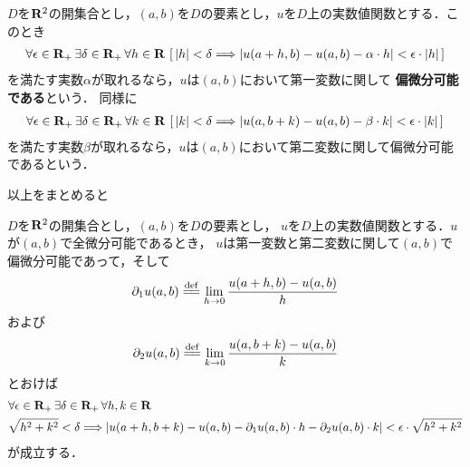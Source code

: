 	\begin{screen}
		\begin{dfn}[偏微分]\label{def:partially_differentiability}
			$D$を$\mathbf{R}^2$の開集合とし，$(a,b)$を$D$の要素とし，$u$を$D$上の実数値関数とする．このとき
			\begin{align}
				\forall \epsilon \in \mathbf{R}_+\, \exists \delta \in \mathbf{R}_+\, \forall h \in \mathbf{R}\, 
				\left[\, |h| < \delta \Longrightarrow
				\left|u(a+h,b) - u(a,b) - \alpha \cdot h\right| < \epsilon \cdot |h|\, \right]
			\end{align}
			を満たす実数$\alpha$が取れるなら，$u$は$(a,b)$において第一変数に関して
			{\bf 偏微分可能である}という．
			同様に
			\begin{align}
				\forall \epsilon \in \mathbf{R}_+\, \exists \delta \in \mathbf{R}_+\, \forall k \in \mathbf{R}\, 
				\left[\, |k| < \delta \Longrightarrow
				\left|u(a,b+k) - u(a,b) - \beta \cdot k\right| < \epsilon \cdot |k|\, \right]
			\end{align}
			を満たす実数$\beta$が取れるなら，$u$は$(a,b)$において第二変数に関して偏微分可能であるという．
		\end{dfn}
	\end{screen}
	
	以上をまとめると
	
	\begin{screen}
		\begin{thm}[全微分可能なら偏微分可能]
			$D$を$\mathbf{R}^2$の開集合とし，$(a,b)$を$D$の要素とし，
			$u$を$D$上の実数値関数とする．$u$が$(a,b)$で全微分可能であるとき，
			$u$は第一変数と第二変数に関して$(a,b)$で偏微分可能であって，そして
			\begin{align}
				\partial_1 u(a,b) \defeq \lim_{h \to 0} \frac{u(a+h,b) - u(a,b)}{h}
			\end{align}
			および
			\begin{align}
				\partial_2 u(a,b) \defeq \lim_{k \to 0} \frac{u(a,b+k) - u(a,b)}{k}
			\end{align}
			とおけば
			\begin{align}
				&\forall \epsilon \in \mathbf{R}_+\, \exists \delta \in \mathbf{R}_+\, \forall h,k \in \mathbf{R}\, \\
				&\sqrt{h^2 + k^2} < \delta \Longrightarrow
				\left|u(a+h,b+k) - u(a,b) - \partial_1 u(a,b) \cdot h - \partial_2 u(a,b) \cdot k\right| 
				< \epsilon \cdot \sqrt{h^2 + k^2}
			\end{align}
			が成立する．
		\end{thm}
	\end{screen}
	
